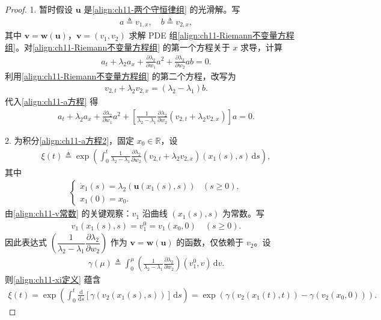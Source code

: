 \documentclass[../../main.tex]{subfiles}
\begin{document}
\begin{proof}
1. 暂时假设 $\mathbf{u}$ 是\eqref{align:ch11-两个守恒律组} 的光滑解。写
\begin{align}
a\triangleq v_{1,x},\quad b\triangleq v_{2,x},
\label{align:ch11-a定义}
\end{align}
其中 $\mathbf{v}=\mathbf{w}(\mathbf{u})$，$\mathbf{v}=(v_1,v_2)$ 求解 PDE 组\eqref{align:ch11-Riemann不变量方程组}。对\eqref{align:ch11-Riemann不变量方程组} 的第一个方程关于 $x$ 求导，计算
\begin{align}
a_t+\lambda_2 a_x+\frac{\partial\lambda_2}{\partial w_1}a^2+\frac{\partial\lambda_2}{\partial w_2}ab=0.
\label{align:ch11-a方程}
\end{align}
利用\eqref{align:ch11-Riemann不变量方程组} 的第二个方程，改写为
\begin{align*}
v_{2,t}+\lambda_2 v_{2,x}=(\lambda_2-\lambda_1)b.
\end{align*}
代入\eqref{align:ch11-a方程} 得
\begin{align}
a_t+\lambda_2 a_x+\frac{\partial\lambda_2}{\partial w_1}a^2+\left[\frac{1}{\lambda_2-\lambda_1}\frac{\partial\lambda_2}{\partial w_2}(v_{2,t}+\lambda_2 v_{2,x})\right]a=0.
\label{align:ch11-a方程2}
\end{align}

2. 为积分\eqref{align:ch11-a方程2}，固定 $x_0\in\mathbb{R}$，设
\begin{align}
\xi(t)\triangleq\exp\left(\int_0^t\frac{1}{\lambda_2-\lambda_1}\frac{\partial\lambda_2}{\partial w_2}(v_{2,t}+\lambda_2 v_{2,x})(x_1(s),s)\,\mathrm{d}s\right),
\label{align:ch11-xi定义}
\end{align}
其中
\begin{align*}
\begin{cases}
\dot{x}_1(s)=\lambda_2(\mathbf{u}(x_1(s),s)) & (s\geqslant 0),\\
x_1(0)=x_0.
\end{cases}
\end{align*}
由\eqref{align:ch11-v常数} 的关键观察：$v_1$ 沿曲线 $(x_1(s),s)$ 为常数。写
\begin{align*}
v_1(x_1(s),s)=v_1^0=v_1(x_0,0) \quad (s\geqslant 0).
\end{align*}
因此表达式 $\left(\dfrac{1}{\lambda_2-\lambda_1}\dfrac{\partial\lambda_2}{\partial w_2}\right)$ 作为 $\mathbf{v}=\mathbf{w}(\mathbf{u})$ 的函数，仅依赖于 $v_2$。设
\begin{align*}
\gamma(\mu)\triangleq\int_0^\mu\left(\frac{1}{\lambda_2-\lambda_1}\frac{\partial\lambda_2}{\partial w_2}\right)(v_1^0,v)\,\mathrm{d}v.
\end{align*}
则\eqref{align:ch11-xi定义} 蕴含
\begin{align}
\xi(t)=\exp\left(\int_0^t\frac{\mathrm{d}}{\mathrm{d}s}[\gamma(v_2(x_1(s),s))]\,\mathrm{d}s\right)=\exp(\gamma(v_2(x_1(t),t))-\gamma(v_2(x_0,0))).
\label{align:ch11-xi化简}
\end{align}


\end{proof}
\end{document}
